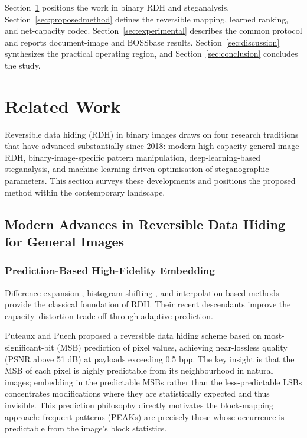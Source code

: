 \documentclass[a4paper,fleqn]{cas-dc}
\begin{document}
Section~\ref{sec:relatedwork} positions the work in binary RDH and
steganalysis. Section~\ref{sec:proposedmethod} defines the reversible mapping,
learned ranking, and net-capacity codec. Section~\ref{sec:experimental}
describes the common protocol and reports document-image and BOSSbase results.
Section~\ref{sec:discussion} synthesizes the practical operating region, and
Section~\ref{sec:conclusion} concludes the study.


\section{Related Work}
\label{sec:relatedwork}

Reversible data hiding (RDH) in binary images draws on four research traditions that have advanced substantially since 2018: modern high-capacity general-image RDH, binary-image-specific pattern manipulation, deep-learning-based steganalysis, and machine-learning-driven optimisation of steganographic parameters. This section surveys these developments and positions the proposed method within the contemporary landscape.

\subsection{Modern Advances in Reversible Data Hiding for General Images}

\subsubsection{Prediction-Based High-Fidelity Embedding}

Difference expansion \cite{11}, histogram shifting \cite{18}, and
interpolation-based methods \cite{24} provide the classical foundation of RDH.
Their recent descendants improve the capacity--distortion trade-off through
adaptive prediction.

Puteaux and Puech \cite{Puteaux2018MSB} proposed a reversible data hiding scheme based on most-significant-bit (MSB) prediction of pixel values, achieving near-lossless quality (PSNR above 51 dB) at payloads exceeding 0.5 bpp. The key insight is that the MSB of each pixel is highly predictable from its neighbourhood in natural images; embedding in the predictable MSBs rather than the less-predictable LSBs concentrates modifications where they are statistically expected and thus invisible. This prediction philosophy directly motivates the block-mapping approach: frequent patterns (PEAKs) are precisely those whose occurrence is predictable from the image's block statistics.
\end{document}
